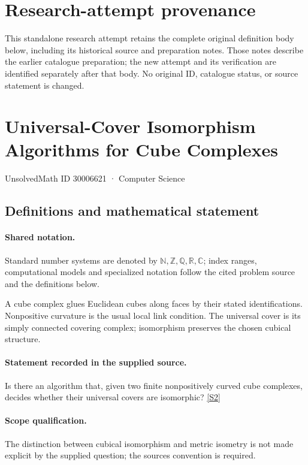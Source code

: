 \documentclass[11pt]{article}
\begin{document}
\section*{Research-attempt provenance}
This standalone research attempt retains the complete original definition body below,
including its historical source and preparation notes. Those notes describe the
earlier catalogue preparation; the new attempt and its verification are identified
separately after that body. No original ID, catalogue status, or source statement is changed.

\section{Universal-Cover Isomorphism Algorithms for Cube Complexes}\label{30006621}
{\small UnsolvedMath ID 30006621 · Computer Science}
\subsection{Definitions and mathematical statement}

\paragraph{Shared notation.}Standard number systems are denoted by $\mathbb N,\mathbb Z,\mathbb Q,\mathbb R,\mathbb C$; index ranges, computational models and specialized notation follow the cited problem source and the definitions below.


A cube complex glues Euclidean cubes along faces by their stated identifications. Nonpositive curvature is the usual local link condition. The universal cover is its simply connected covering complex; isomorphism preserves the chosen cubical structure.
\paragraph{Statement recorded in the supplied source.}
Is there an algorithm that, given two finite nonpositively curved cube complexes, decides whether their universal covers are isomorphic? \href{https://doi.org/10.4171/owr/2026/8}{[S2]}
\paragraph{Scope qualification.}
The distinction between cubical isomorphism and metric isometry is not made explicit by the supplied question; the source\textquotesingle s convention is required.
\end{document}
